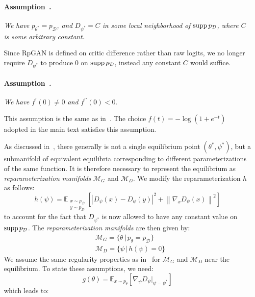 \paragraph{Assumption~.}
\label{a:1}
\emph{We have $p_{\theta^*}=p_\mathcal{D}$, and $D_{\psi^*}=C$ in some local neighborhood of $\operatorname{supp} p_\mathcal{D}$, where $C$ is some arbitrary constant.}

\noindent Since RpGAN is defined on critic difference rather than raw logits, we no longer require $D_{\psi^*}$ to produce 0 on $\operatorname{supp} p_\mathcal{D}$, instead any constant $C$ would suffice.

\paragraph{Assumption~.}
\label{a:2}
\emph{We have $f^\prime(0)\neq0$ and $f^{\prime\prime}(0)<0$.}

\noindent This assumption is the same as in~\cite{r1}. The choice $f(t) = -\log(1+e^{-t})$ adopted in the main text satisfies this assumption.

As discussed in~\cite{r1}, there generally is not a single equilibrium point $(\theta^*,\psi^*)$, but a submanifold of equivalent equilibria corresponding to different parameterizations of the same function. It is therefore necessary to represent the equilibrium as \emph{reparameterization manifolds} $\mathcal{M}_G$ and $\mathcal{M}_D$. We modify the reparameterization $h$ as follows:
\begin{equation}
\label{eq:h}
h(\psi)=\mathbb{E}_{\substack{x\sim p_\mathcal{D}\\y\sim p_\mathcal{D}}}\left[\left | D_\psi(x)-D_\psi(y)\right |^2   +  \left \| \nabla_x D_\psi(x) \right \|^2\right]
\end{equation}
to account for the fact that $D_{\psi^*}$ is now allowed to have any constant value on $\operatorname{supp} p_\mathcal{D}$. The \emph{reparameterization manifolds} are then given by:
\begin{align}
&\mathcal{M}_G=\{\theta\,\rvert\,p_\theta=p_\mathcal{D}\} \\
&\mathcal{M}_D=\{\psi\,\rvert\,h(\psi)=0 \}
\end{align}
We assume the same regularity properties as in~\cite{r1} for $\mathcal{M}_G$ and $\mathcal{M}_D$ near the equilibrium. To state these assumptions, we need:
\begin{equation}
g(\theta)=\mathbb{E}_{x\sim p_\theta}\left[\nabla_\psi D_\psi\rvert_{\psi=\psi^*}\right]
\end{equation}
which leads to:
